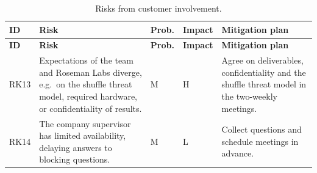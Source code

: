 \begingroup
\small
\renewcommand{\arraystretch}{1.25}
\begin{longtable}{
  >{\raggedright\arraybackslash}p{}
  >{\raggedright\arraybackslash}p{}
  >{\centering\arraybackslash}p{}
  >{\centering\arraybackslash}p{}
  >{\raggedright\arraybackslash}p{}}
\caption{Risks from customer involvement.}\label{tab:risk-cust}\\
\toprule
\textbf{ID} & \textbf{Risk} & \textbf{Prob.} & \textbf{Impact} & \textbf{Mitigation plan}\\
\midrule
\endfirsthead
\toprule
\textbf{ID} & \textbf{Risk} & \textbf{Prob.} & \textbf{Impact} & \textbf{Mitigation plan}\\
\midrule
\endhead
\bottomrule
\endfoot

RK13 &
Expectations of the team and Roseman Labs diverge, e.g.\ on the shuffle threat model, required hardware, or confidentiality of results. &
M & H &
Agree on deliverables, confidentiality and the shuffle threat model in the two-weekly meetings.
\\ \midrule
 
RK14 &
The company supervisor has limited availability, delaying answers to blocking questions. &
M & L &
Collect questions and schedule meetings in advance.
\\
\end{longtable}
\endgroup